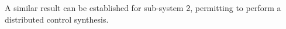 A similar result can be established for sub-system 2, permitting to perform
a distributed control synthesis.

